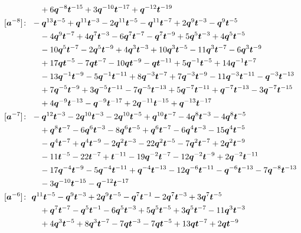 \begin{align*}
& \quad +6 \bq^{-8} \bt^{-15} +3 \bq^{-10} \bt^{-17} +\bq^{-12} \bt^{-19} \\
[\ba^{-8}]\colon\ & -\bq^{13} \bt^{-5} +\bq^{11} \bt^{-3} -2 \bq^{11} \bt^{-5} -\bq^{11} \bt^{-7} +2 \bq^{9} \bt^{-3} -\bq^{9} \bt^{-5} \\
& \quad -4 \bq^{9} \bt^{-7} +4 \bq^{7} \bt^{-3} -6 \bq^{7} \bt^{-7} -\bq^{7} \bt^{-9} +5 \bq^{5} \bt^{-3} +4 \bq^{5} \bt^{-5} \\
& \quad -10 \bq^{5} \bt^{-7} -2 \bq^{5} \bt^{-9} +4 \bq^{3} \bt^{-3} +10 \bq^{3} \bt^{-5} -11 \bq^{3} \bt^{-7} -6 \bq^{3} \bt^{-9} \\
& \quad +17 \bq \bt^{-5} -7 \bq \bt^{-7} -10 \bq \bt^{-9} -\bq \bt^{-11} +5 \bq^{-1} \bt^{-5} +14 \bq^{-1} \bt^{-7} \\
& \quad -13 \bq^{-1} \bt^{-9} -5 \bq^{-1} \bt^{-11} +8 \bq^{-3} \bt^{-7} +7 \bq^{-3} \bt^{-9} -11 \bq^{-3} \bt^{-11} -\bq^{-3} \bt^{-13} \\
& \quad +7 \bq^{-5} \bt^{-9} +3 \bq^{-5} \bt^{-11} -7 \bq^{-5} \bt^{-13} +5 \bq^{-7} \bt^{-11} +\bq^{-7} \bt^{-13} -3 \bq^{-7} \bt^{-15} \\
& \quad +4 \bq^{-9} \bt^{-13} -\bq^{-9} \bt^{-17} +2 \bq^{-11} \bt^{-15} +\bq^{-13} \bt^{-17} \\
[\ba^{-7}]\colon\ & -\bq^{12} \bt^{-3} -2 \bq^{10} \bt^{-3} -2 \bq^{10} \bt^{-5} +\bq^{10} \bt^{-7} -4 \bq^{8} \bt^{-3} -4 \bq^{8} \bt^{-5} \\
& \quad +\bq^{8} \bt^{-7} -6 \bq^{6} \bt^{-3} -8 \bq^{6} \bt^{-5} +\bq^{6} \bt^{-7} -6 \bq^{4} \bt^{-3} -15 \bq^{4} \bt^{-5} \\
& \quad -\bq^{4} \bt^{-7} +\bq^{4} \bt^{-9} -2 \bq^{2} \bt^{-3} -22 \bq^{2} \bt^{-5} -7 \bq^{2} \bt^{-7} +2 \bq^{2} \bt^{-9} \\
& \quad -11 \bt^{-5} -22 \bt^{-7} +\bt^{-11} -19 \bq^{-2} \bt^{-7} -12 \bq^{-2} \bt^{-9} +2 \bq^{-2} \bt^{-11} \\
& \quad -17 \bq^{-4} \bt^{-9} -5 \bq^{-4} \bt^{-11} +\bq^{-4} \bt^{-13} -12 \bq^{-6} \bt^{-11} -\bq^{-6} \bt^{-13} -7 \bq^{-8} \bt^{-13} \\
& \quad -3 \bq^{-10} \bt^{-15} -\bq^{-12} \bt^{-17} \\
[\ba^{-6}]\colon\ & \bq^{11} \bt^{-5} -\bq^{9} \bt^{-3} +2 \bq^{9} \bt^{-5} -\bq^{7} \bt^{-1} -2 \bq^{7} \bt^{-3} +3 \bq^{7} \bt^{-5} \\
& \quad +\bq^{7} \bt^{-7} -\bq^{5} \bt^{-1} -6 \bq^{5} \bt^{-3} +5 \bq^{5} \bt^{-5} +3 \bq^{5} \bt^{-7} -11 \bq^{3} \bt^{-3} \\
& \quad +4 \bq^{3} \bt^{-5} +8 \bq^{3} \bt^{-7} -7 \bq \bt^{-3} -7 \bq \bt^{-5} +13 \bq \bt^{-7} +2 \bq \bt^{-9} \\

\end{align*}
